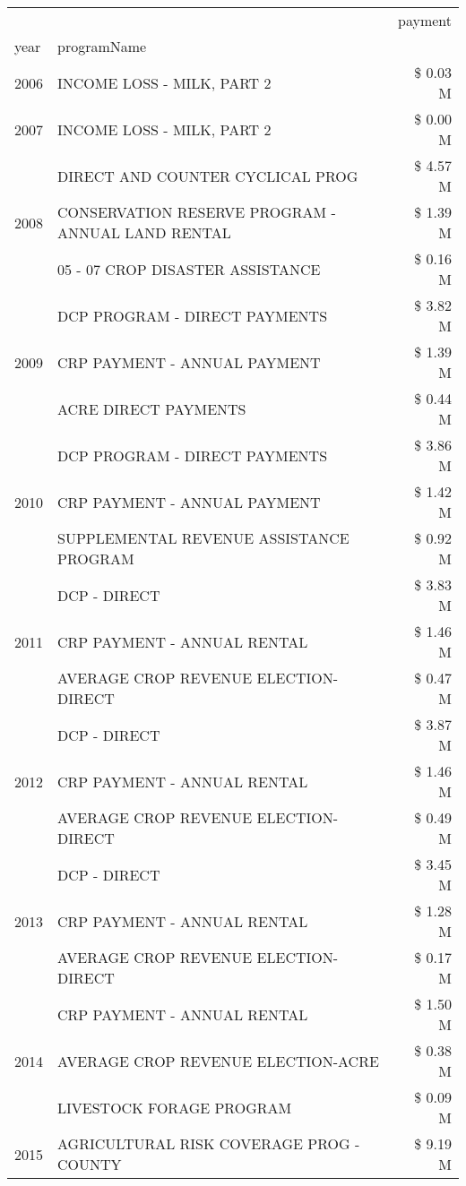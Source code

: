 \begin{tabular}{llr}
\toprule
 &  & payment \\
year & programName &  \\
\midrule
2006 & INCOME LOSS - MILK, PART 2 & \$ 0.03 M \\
\cline{1-3}
2007 & INCOME LOSS - MILK, PART 2 & \$ 0.00 M \\
\cline{1-3}
\multirow[t]{3}{*}{2008} & DIRECT AND COUNTER CYCLICAL PROG & \$ 4.57 M \\
 & CONSERVATION RESERVE PROGRAM - ANNUAL LAND RENTAL & \$ 1.39 M \\
 & 05 - 07 CROP DISASTER ASSISTANCE & \$ 0.16 M \\
\cline{1-3}
\multirow[t]{3}{*}{2009} & DCP PROGRAM - DIRECT PAYMENTS & \$ 3.82 M \\
 & CRP PAYMENT - ANNUAL PAYMENT & \$ 1.39 M \\
 & ACRE DIRECT PAYMENTS & \$ 0.44 M \\
\cline{1-3}
\multirow[t]{3}{*}{2010} & DCP PROGRAM - DIRECT PAYMENTS & \$ 3.86 M \\
 & CRP PAYMENT - ANNUAL PAYMENT & \$ 1.42 M \\
 & SUPPLEMENTAL REVENUE ASSISTANCE PROGRAM & \$ 0.92 M \\
\cline{1-3}
\multirow[t]{3}{*}{2011} & DCP - DIRECT & \$ 3.83 M \\
 & CRP PAYMENT - ANNUAL RENTAL & \$ 1.46 M \\
 & AVERAGE CROP REVENUE ELECTION-DIRECT & \$ 0.47 M \\
\cline{1-3}
\multirow[t]{3}{*}{2012} & DCP - DIRECT & \$ 3.87 M \\
 & CRP PAYMENT - ANNUAL RENTAL & \$ 1.46 M \\
 & AVERAGE CROP REVENUE ELECTION-DIRECT & \$ 0.49 M \\
\cline{1-3}
\multirow[t]{3}{*}{2013} & DCP - DIRECT & \$ 3.45 M \\
 & CRP PAYMENT - ANNUAL RENTAL & \$ 1.28 M \\
 & AVERAGE CROP REVENUE ELECTION-DIRECT & \$ 0.17 M \\
\cline{1-3}
\multirow[t]{3}{*}{2014} & CRP PAYMENT - ANNUAL RENTAL & \$ 1.50 M \\
 & AVERAGE CROP REVENUE ELECTION-ACRE & \$ 0.38 M \\
 & LIVESTOCK FORAGE PROGRAM & \$ 0.09 M \\
\cline{1-3}
\multirow[t]{3}{*}{2015} & AGRICULTURAL RISK COVERAGE PROG - COUNTY & \$ 9.19 M \\

\end{tabular}
